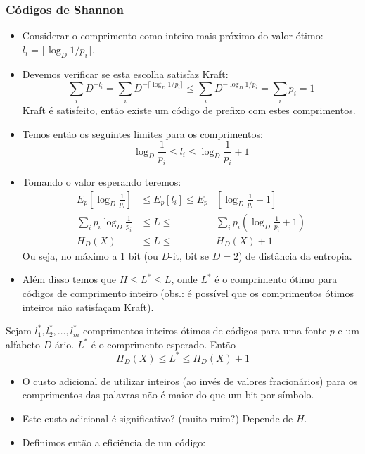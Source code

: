 \begin{frame}[allowframebreaks]
  \frametitle{Códigos de Shannon}
  \begin{itemize}
  \item Considerar o comprimento como inteiro mais próximo do valor ótimo: $l_i = \lceil \log_D 1/p_i \rceil$.
  \item Devemos verificar se esta escolha satisfaz Kraft:
	\begin{equation}
	\sum_i D^{-l_i} = \sum_i D ^{- \lceil \log_D 1/p_i \rceil} \leq \sum_i D^{-\log_D 1/p_i} = \sum_i p_i = 1
	\end{equation}
	Kraft é satisfeito, então existe um código de prefixo com estes comprimentos.
  \item Temos então os seguintes limites para os comprimentos:
	\begin{equation}
	\log_D \frac{1}{p_i} \leq l_i \leq \log_D \frac{1}{p_i} + 1
	\end{equation}
  \item Tomando o valor esperando teremos:
	\begin{eqnarray}
	E_p \left[ \log_D \frac{1}{p_i} \right]  & \leq E_p \left[ l_i \right] \leq E_p & \left[ \log_D \frac{1}{p_i} + 1 \right] \nonumber \\
	\sum_i p_i \log_D \frac{1}{p_i} & \leq L \leq & \sum_i p_i \left( \log_D \frac{1}{p_i} + 1 \right) \nonumber \\
	H_D(X) & \leq L \leq & H_D(X) + 1
	\end{eqnarray}
 	Ou seja, no máximo a 1 bit (ou $D$-it, bit se $D=2$) de distância da entropia.
  \item Além disso temos que $H \leq L^\ast \leq L$, onde $L^\ast$ é o comprimento ótimo para códigos de comprimento
	inteiro (obs.: é possível que os comprimentos ótimos inteiros não satisfaçam Kraft). 
  \end{itemize}
  
  \framebreak
  \begin{theorem}
  Sejam $l_1^\ast, l_2^\ast, \ldots, l_m^\ast$ comprimentos inteiros ótimos de códigos para uma fonte $p$ e um
  alfabeto $D$-ário. $L^\ast$ é o comprimento esperado. Então
	\begin{equation}
	H_D(X) \leq L^\ast \leq H_D(X) + 1
	\end{equation}
  \end{theorem}
  \begin{itemize}
  \item O custo adicional de utilizar inteiros (ao invés de valores fracionários) para os comprimentos das palavras
	não é maior do que um bit por símbolo.
  \item Este custo adicional é significativo? (muito ruim?) Depende de $H$.
  \item Definimos então a eficiência de um código:
  \end{itemize}
  

\end{frame}
